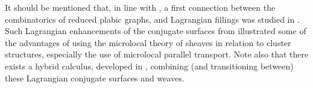 \begin{remark} It should be mentioned that, in line with , a first connection between the combinatorics of reduced plabic graphs, and Lagrangian fillings was studied in \cite{STWZ19}. Such Lagrangian enhancements of the conjugate surfaces from \cite{GonKen13} illustrated some of the advantages of using the microlocal theory of sheaves in relation to cluster structures, especially the use of microlocal parallel transport. Note also that there exists a hybrid calculus, developed in \cite{casals2022conjugate}, combining (and transitioning between) these Lagrangian conjugate surfaces and weaves.\sbs
\end{remark}